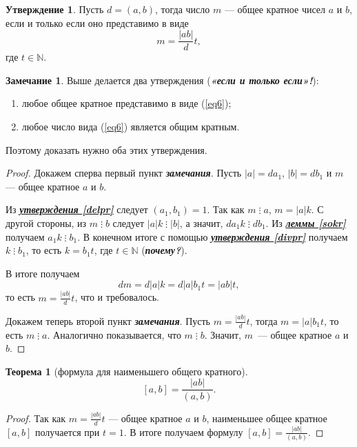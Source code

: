\documentclass[14pt, a4paper]{extarticle}
\theoremstyle{definition}
\newtheorem{theorem}{Теорема}
\newtheorem*{remark}{Замечание}
\newtheorem{statement}{Утверждение}
\newcommand{\divisible}{\mathop{\vdots}}
\begin{document}
	\begin{statement}
		Пусть $d=(a,b)$, тогда число $m$ --- общее кратное чисел $a$ и $b$, если и только если оно представимо в виде
		\begin{equation}
		\label{eq6}
			m=\frac{|ab|}{d}t,
		\end{equation}
		где $t\in\mathbb{N}$.
	\end{statement}
	\begin{remark}
		Выше делается два утверждения (\textbf{\textit{«если и только если»!}}):
		\begin{enumerate}[topsep=0pt,itemsep=-1ex,partopsep=1ex,parsep=1ex]
			\item любое общее кратное представимо в виде (\ref{eq6});
			\item любое число вида (\ref{eq6}) является общим кратным.
		\end{enumerate}
		Поэтому доказать нужно оба этих утверждения.
	\end{remark}
	\begin{proof}
		Докажем сперва первый пункт \textbf{\textit{замечания}}. Пусть $|a|=da_1$, $|b|=db_1$ и $m$ --- общее кратное $a$ и $b$.
		
		Из \hyperref[delpr]{\textbf{\textit{утверждения \ref*{delpr}}}} следует $(a_1,b_1)=1$. Так как $m\divisible a$, $m=|a|k$. С другой стороны, из $m\divisible b$ следует $|a|k\divisible|b|$, а значит, $da_1k\divisible db_1$. Из \hyperref[sokr]{\textbf{\textit{леммы \ref*{sokr}}}} получаем $a_1k\divisible b_1$. В конечном итоге с помощью \hyperref[divpr]{\textbf{\textit{утверждения \ref*{divpr}}}} получаем $k\divisible b_1$, то есть $k=b_1t$, где $t\in\mathbb{N}$ (\textbf{\textit{почему?}}).
		
		В итоге получаем $$dm=d|a|k=d|a|b_1t=|ab|t,$$ то есть $m=\frac{|ab|}{d}t$, что и требовалось.
		
		Докажем теперь второй пункт \textbf{\textit{замечания}}. Пусть $m=\frac{|ab|}{d}t$, тогда $m=|a|b_1t$, то есть $m\divisible a$. Аналогично показывается, что $m\divisible b$. Значит, $m$~--- общее кратное $a$ и $b$.
	\end{proof}
	
	\begin{theorem}[формула для наименьшего общего кратного]
		\begin{equation}
		\label{eq7}
			\boxed{[a,b]=\frac{|ab|}{(a,b)}.}
		\end{equation}
	\end{theorem}
	\begin{proof}
		Так как $m=\frac{|ab|}{d}t$ --- общее кратное $a$ и $b$, наименьшее общее кратное $[a,b]$ получается при $t=1$. В итоге получаем формулу $[a,b]=\frac{|ab|}{(a,b)}$.
	\end{proof}
\end{document}
